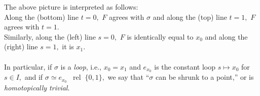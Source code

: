 \documentclass[12pt]{article}
\theoremstyle{definition}
\numberwithin{thm}{section}
\newcommand{\rel}{\;\;\operatorname{rel}\;}
\begin{document}
\begin{center}
\end{center}

The above picture is interpreted as follows: \\
Along the (bottom) line $t = 0,$ $F$ agrees with $\sigma$ and along the (top) line $t = 1,$ $F$ agrees with $t = 1.$\\
Similarly, along the (left) line $s = 0,$ $F$ is identically equal to $x_0$ and along the (right) line $s = 1,$ it is $x_1.$\\~\\
%
In particular, if $\sigma$ is a \emph{loop}, i.e., $x_0 = x_1$ and $e_{x_0}$ is the constant loop $s \mapsto x_0$ for $s \in I,$ and if $\sigma \simeq e_{x_0} \rel \{0, 1\},$ we say that ``$\sigma$ can be shrunk to a point,'' or is \emph{homotopically trivial}.
\end{document}
